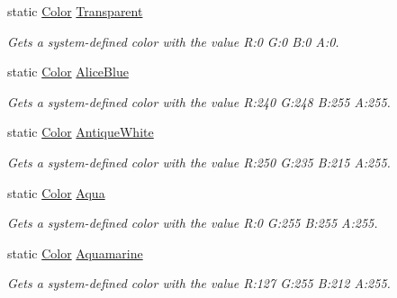 \begin{DoxyCompactItemize}
static \hyperlink{struct_microsoft_1_1_xna_1_1_framework_1_1_color}{Color} \hyperlink{struct_microsoft_1_1_xna_1_1_framework_1_1_color_ac10dfa68094a7efdd13d85de53669233}{Transparent}
\begin{DoxyCompactList}\small\item\em Gets a system-\/defined color with the value R\+:0 G\+:0 B\+:0 A\+:0.\end{DoxyCompactList}\item 
static \hyperlink{struct_microsoft_1_1_xna_1_1_framework_1_1_color}{Color} \hyperlink{struct_microsoft_1_1_xna_1_1_framework_1_1_color_ab7051ab6dbb7a743a98a7b1f463dfa14}{Alice\+Blue}
\begin{DoxyCompactList}\small\item\em Gets a system-\/defined color with the value R\+:240 G\+:248 B\+:255 A\+:255.\end{DoxyCompactList}\item 
static \hyperlink{struct_microsoft_1_1_xna_1_1_framework_1_1_color}{Color} \hyperlink{struct_microsoft_1_1_xna_1_1_framework_1_1_color_ab39b87a8ed65d6b13da1f6b88f95ec6f}{Antique\+White}
\begin{DoxyCompactList}\small\item\em Gets a system-\/defined color with the value R\+:250 G\+:235 B\+:215 A\+:255.\end{DoxyCompactList}\item 
static \hyperlink{struct_microsoft_1_1_xna_1_1_framework_1_1_color}{Color} \hyperlink{struct_microsoft_1_1_xna_1_1_framework_1_1_color_a363a0d93bc01ecef431d8a6db0d3dcaa}{Aqua}
\begin{DoxyCompactList}\small\item\em Gets a system-\/defined color with the value R\+:0 G\+:255 B\+:255 A\+:255.\end{DoxyCompactList}\item 
static \hyperlink{struct_microsoft_1_1_xna_1_1_framework_1_1_color}{Color} \hyperlink{struct_microsoft_1_1_xna_1_1_framework_1_1_color_a348181022a36f035d4b23cd4e5c7ca2f}{Aquamarine}
\begin{DoxyCompactList}\small\item\em Gets a system-\/defined color with the value R\+:127 G\+:255 B\+:212 A\+:255.\end{DoxyCompactList}\item 

\end{DoxyCompactItemize}

